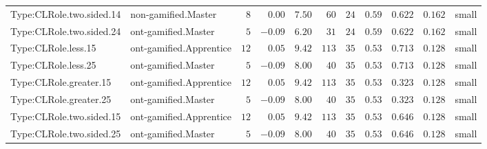 \documentclass[6pt,a4paper]{article}
\begin{document}
{\begin{longtable}{llrrrrrrrrl}
Type:CLRole.two.sided.14&non-gamified.Master&$ 8$&$ 0.00$&$ 7.50$&$ 60$&$ 24$&$ 0.59$&$0.622$&$0.162$&small\tabularnewline
Type:CLRole.two.sided.24&ont-gamified.Master&$ 5$&$-0.09$&$ 6.20$&$ 31$&$ 24$&$ 0.59$&$0.622$&$0.162$&small\tabularnewline
Type:CLRole.less.15&ont-gamified.Apprentice&$12$&$ 0.05$&$ 9.42$&$113$&$ 35$&$ 0.53$&$0.713$&$0.128$&small\tabularnewline
Type:CLRole.less.25&ont-gamified.Master&$ 5$&$-0.09$&$ 8.00$&$ 40$&$ 35$&$ 0.53$&$0.713$&$0.128$&small\tabularnewline
Type:CLRole.greater.15&ont-gamified.Apprentice&$12$&$ 0.05$&$ 9.42$&$113$&$ 35$&$ 0.53$&$0.323$&$0.128$&small\tabularnewline
Type:CLRole.greater.25&ont-gamified.Master&$ 5$&$-0.09$&$ 8.00$&$ 40$&$ 35$&$ 0.53$&$0.323$&$0.128$&small\tabularnewline
\newpage
Type:CLRole.two.sided.15&ont-gamified.Apprentice&$12$&$ 0.05$&$ 9.42$&$113$&$ 35$&$ 0.53$&$0.646$&$0.128$&small\tabularnewline
Type:CLRole.two.sided.25&ont-gamified.Master&$ 5$&$-0.09$&$ 8.00$&$ 40$&$ 35$&$ 0.53$&$0.646$&$0.128$&small\tabularnewline
\hline
\end{longtable}}
\end{document}
